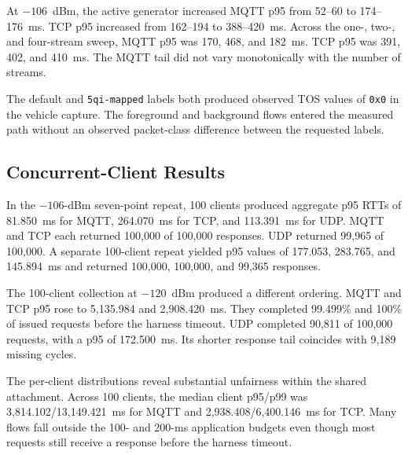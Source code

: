 At $-106$~dBm, the active generator increased MQTT p95 from 52--60 to
174--176~ms. TCP p95 increased from 162--194 to 388--420~ms. Across the one-,
two-, and four-stream sweep, MQTT p95 was 170, 468, and 182~ms. TCP p95 was
391, 402, and 410~ms. The MQTT tail did not vary monotonically with the number
of streams.

The default and \texttt{5qi-mapped} labels both produced observed TOS values of
\texttt{0x0} in the vehicle capture. The foreground and background flows
entered the measured path without an observed packet-class difference between
the requested labels.

\subsection{Concurrent-Client Results}

In the $-106$-dBm seven-point repeat, 100 clients produced aggregate p95 RTTs
of 81.850~ms for MQTT, 264.070~ms for TCP, and 113.391~ms for UDP. MQTT and TCP
each returned 100,000 of 100,000 responses. UDP returned 99,965 of 100,000. A
separate 100-client repeat yielded p95 values of 177.053, 283.765, and
145.894~ms and returned 100,000, 100,000, and 99,365 responses.

The 100-client collection at $-120$~dBm produced a different ordering. MQTT
and TCP p95 rose to 5,135.984 and 2,908.420~ms. They completed 99.499\% and
100\% of issued requests before the harness timeout. UDP completed 90,811 of
100,000 requests, with a p95 of 172.500~ms. Its shorter response tail coincides
with 9,189 missing cycles.

The per-client distributions reveal substantial unfairness within the shared
attachment. Across 100 clients, the median client p95/p99 was
3,814.102/13,149.421~ms for MQTT and 2,938.408/6,400.146~ms for TCP. Many flows
fall outside the 100- and 200-ms application budgets even though most requests
still receive a response before the harness timeout.
